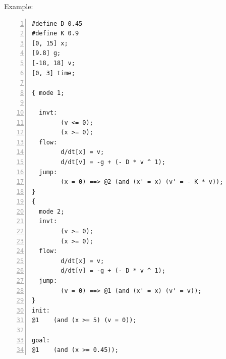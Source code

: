 
Example:

\begin{Verbatim}[fontfamily=courier, frame=single, framesep=5mm, numbers=left, fontsize=\footnotesize]
#define D 0.45
#define K 0.9
[0, 15] x;
[9.8] g;
[-18, 18] v;
[0, 3] time;

{ mode 1;

  invt:
        (v <= 0);
        (x >= 0);
  flow:
        d/dt[x] = v;
        d/dt[v] = -g + (- D * v ^ 1);
  jump:
        (x = 0) ==> @2 (and (x' = x) (v' = - K * v));
}
{
  mode 2;
  invt:
        (v >= 0);
        (x >= 0);
  flow:
        d/dt[x] = v;
        d/dt[v] = -g + (- D * v ^ 1);
  jump:
        (v = 0) ==> @1 (and (x' = x) (v' = v));
}
init:
@1    (and (x >= 5) (v = 0));

goal:
@1    (and (x >= 0.45));
\end{Verbatim}


